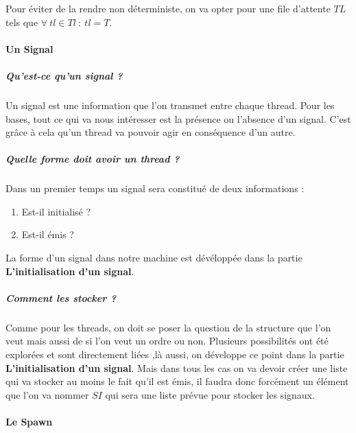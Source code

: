 \documentclass[10pt,a4paper]{article}
\begin{document}
					Pour éviter de la rendre non déterministe, on va opter pour une file d'attente $TL$ tels que $\forall~tl \in Tl~:~tl = T$.
					\bigbreak
						
				\paragraph{Un Signal} 
					
					\subparagraph{Qu'est-ce qu'un signal ?}
					Un signal est une information que l'on transmet entre chaque thread. Pour les bases, tout ce qui va nous intéresser est la présence ou l'absence d'un signal. C'est grâce à cela qu'un thread va pouvoir agir en conséquence d'un autre. 
						
					\subparagraph{Quelle forme doit avoir un thread ?} 
					Dans un premier temps un signal sera constitué de deux informations : 
					\begin{enumerate}
						\item Est-il initialisé ?
						\item Est-il émis ?
					\end{enumerate}
					La forme d'un signal dans notre machine est dévéloppée dans la partie \textbf{L'initialisation d'un signal}.
						
					\subparagraph{Comment les stocker ?}
					Comme pour les threads, on doit se poser la question de la structure que l'on veut mais aussi de si l'on veut un ordre ou non. Plusieurs possibilités ont été explorées et sont directement liées ,là aussi, on développe ce point dans la partie \textbf{L'initialisation d'un signal}. Mais dans tous les cas on va devoir créer une liste qui va stocker au moins le fait qu'il est émis, il faudra donc forcément un élément que l'on va nommer $SI$ qui sera une liste prévue pour stocker les signaux.
					\bigbreak 
				
						
				\paragraph{Le Spawn} 
					
\end{document}
